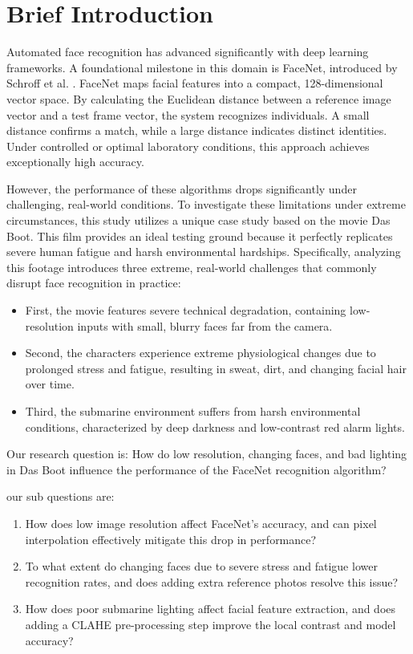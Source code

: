 \documentclass{article}
\begin{document}
\section{Brief Introduction}
Automated face recognition has advanced significantly with deep learning frameworks. A foundational milestone in this domain is FaceNet, introduced by Schroff et al. \cite{schroff2015facenet}. FaceNet maps facial features into a compact, 128-dimensional vector space. By calculating the Euclidean distance between a reference image vector and a test frame vector, the system recognizes individuals. A small distance confirms a match, while a large distance indicates distinct identities. Under controlled or optimal laboratory conditions, this approach achieves exceptionally high accuracy.
\par However, the performance of these algorithms drops significantly under challenging, real-world conditions. To investigate these limitations under extreme circumstances, this study utilizes a unique case study based on the movie Das Boot. This film provides an ideal testing ground because it perfectly replicates severe human fatigue and harsh environmental hardships. Specifically, analyzing this footage introduces three extreme, real-world challenges that commonly disrupt face recognition in practice:
\begin{itemize}
    \item First, the movie features severe technical degradation, containing low-resolution inputs with small, blurry faces far from the camera.
    \item Second, the characters experience extreme physiological changes due to prolonged stress and fatigue, resulting in sweat, dirt, and changing facial hair over time.
    \item Third, the submarine environment suffers from harsh environmental conditions, characterized by deep darkness and low-contrast red alarm lights.
\end{itemize}

Our research question is: How do low resolution, changing faces, and bad lighting in Das Boot influence the performance of the FaceNet recognition algorithm?

our sub questions are:
\begin{enumerate}
    \item How does low image resolution affect FaceNet's accuracy, and can pixel interpolation effectively mitigate this drop in performance?
    \item To what extent do changing faces due to severe stress and fatigue lower recognition rates, and does adding extra reference photos resolve this issue?
    \item How does poor submarine lighting affect facial feature extraction, and does adding a CLAHE pre-processing step improve the local contrast and model accuracy?
\end{enumerate}
\end{document}
